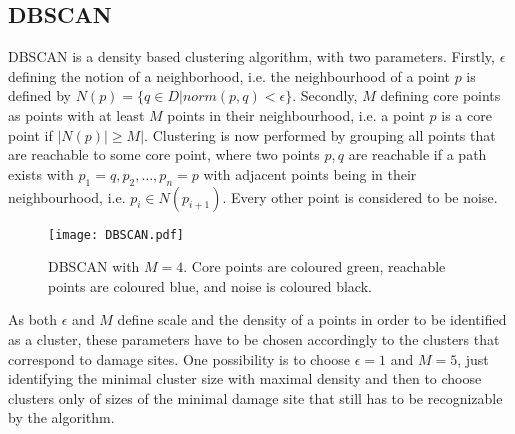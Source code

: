 \subsection{DBSCAN}
\label{sec:DBSCAN}
DBSCAN is a density based clustering algorithm, with two parameters. Firstly, $\epsilon$ defining the notion of a neighborhood, i.e. the neighbourhood of a point $p$ is defined by $N(p) = \{ q \in D | norm(p,q)<\epsilon\}$. Secondly, $M$ defining core points as points with at least $M$ points in their neighbourhood, i.e. a point $p$ is a core point if $|N(p)| \geq M|$. Clustering is now performed by grouping all points that are reachable to some core point, where two points $p,q$ are reachable if a path exists with $p_1=q,p_2,\dots,p_n=p$ with adjacent points being in their neighbourhood, i.e. $p_i\in N(p_{i+1})$. Every other point is considered to be noise. \\



\begin{figure}[H]
\centering
\texttt{[image: DBSCAN.pdf]}
\caption{DBSCAN with $M=4$. Core points are coloured green, reachable points are coloured blue, and noise is coloured black.}
\end{figure}

As both $\epsilon$ and $M$ define scale and the density of a points in order to be identified as a cluster, these parameters have to be chosen accordingly to the clusters that correspond to damage sites. One possibility is to choose $\epsilon=1$ and $M=5$, just identifying the minimal cluster size with maximal density and then to choose clusters only of sizes of the minimal damage site that still has to be recognizable by the algorithm. 

